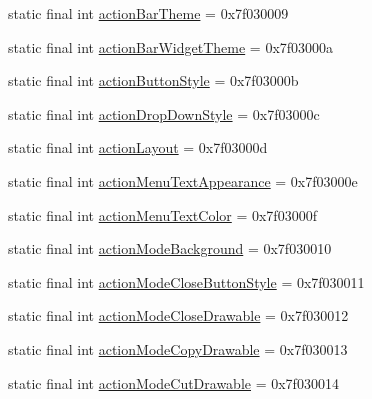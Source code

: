 \begin{DoxyCompactItemize}
\item 
static final int \mbox{\hyperlink{classandroid_1_1support_1_1v7_1_1appcompat_1_1R_1_1attr_a730b542d613874043a93605d14257adc}{action\+Bar\+Theme}} = 0x7f030009
\item 
static final int \mbox{\hyperlink{classandroid_1_1support_1_1v7_1_1appcompat_1_1R_1_1attr_a38efb70b29dc178a9221ab5cffb85285}{action\+Bar\+Widget\+Theme}} = 0x7f03000a
\item 
static final int \mbox{\hyperlink{classandroid_1_1support_1_1v7_1_1appcompat_1_1R_1_1attr_a0d4d8a9b7b8fb3143b6a843205a9f6d4}{action\+Button\+Style}} = 0x7f03000b
\item 
static final int \mbox{\hyperlink{classandroid_1_1support_1_1v7_1_1appcompat_1_1R_1_1attr_a37ef71784a4a5fc6bde80c5dcf0a8a4c}{action\+Drop\+Down\+Style}} = 0x7f03000c
\item 
static final int \mbox{\hyperlink{classandroid_1_1support_1_1v7_1_1appcompat_1_1R_1_1attr_a6347993afb7f8044e8fbaed02bd0b158}{action\+Layout}} = 0x7f03000d
\item 
static final int \mbox{\hyperlink{classandroid_1_1support_1_1v7_1_1appcompat_1_1R_1_1attr_a5669a423003bf4ce2aed058d2f975e0b}{action\+Menu\+Text\+Appearance}} = 0x7f03000e
\item 
static final int \mbox{\hyperlink{classandroid_1_1support_1_1v7_1_1appcompat_1_1R_1_1attr_af8c52187b9d1bd133a1e912b7ef47dbe}{action\+Menu\+Text\+Color}} = 0x7f03000f
\item 
static final int \mbox{\hyperlink{classandroid_1_1support_1_1v7_1_1appcompat_1_1R_1_1attr_a8c2ebe6be03afd4a0612b1194661d719}{action\+Mode\+Background}} = 0x7f030010
\item 
static final int \mbox{\hyperlink{classandroid_1_1support_1_1v7_1_1appcompat_1_1R_1_1attr_a592d96e7b472b9e8bd6366bc29046d88}{action\+Mode\+Close\+Button\+Style}} = 0x7f030011
\item 
static final int \mbox{\hyperlink{classandroid_1_1support_1_1v7_1_1appcompat_1_1R_1_1attr_a1c4edadd18a3dab9e013dae0ef8663b6}{action\+Mode\+Close\+Drawable}} = 0x7f030012
\item 
static final int \mbox{\hyperlink{classandroid_1_1support_1_1v7_1_1appcompat_1_1R_1_1attr_aa21251f34b283b09f971b222e505f83e}{action\+Mode\+Copy\+Drawable}} = 0x7f030013
\item 
static final int \mbox{\hyperlink{classandroid_1_1support_1_1v7_1_1appcompat_1_1R_1_1attr_a7a388f287426647bc512b667671c5dac}{action\+Mode\+Cut\+Drawable}} = 0x7f030014
\item 

\end{DoxyCompactItemize}
